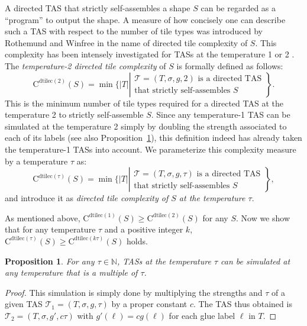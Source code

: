 \documentclass{article}
\newtheorem{proposition}[theorem]{Proposition}
\theoremstyle{remark}
\theoremstyle{definition}
\newcommand{\tas}{\ensuremath{\mathcal{T}}}
\newcommand{\dtilec}[1]{\ensuremath{\mathrm{C}^{\mathrm{dtilec}(#1)}}}
\begin{document}
A directed TAS that strictly self-assembles a shape $S$ can be regarded as a ``program'' to output the shape. 
A measure of how concisely one can describe such a TAS with respect to the number of tile types was introduced by Rothemund and Winfree \cite{RothemundWinfree2000} in the name of directed tile complexity of $S$. 
This complexity has been intensely investigated for TASs at the temperature 1 or 2 \cite{AdChGoHuKeEsRo2002}. 
The {\it temperature-2 directed tile complexity} of $S$ is formally defined as follows: 
\[
	\dtilec{2}(S) = \min \biggl\{|T| 
	\left| 
	\begin{array}{r}
	\mbox{$\tas = (T, \sigma, g, 2)$ is a directed TAS} \\ 
	\mbox{that strictly self-assembles $S$} 
	\end{array}
	\right\}. 
\]
This is the minimum number of tile types required for a directed TAS at the temperature 2 to strictly self-assemble $S$. 
Since any temperature-1 TAS can be simulated at the temperature 2 simply by doubling the strength associated to each of its labels (see also Proposition~\ref{prop:simulation_at_high_temp}), this definition indeed has already taken the temperature-1 TASs into account. 
We parameterize this complexity measure by a temperature $\tau$ as: 
\[
	\dtilec{\tau}(S) = \min \biggl\{|T| 
	\left| 
	\begin{array}{r}
	\mbox{$\tas = (T, \sigma, g, \tau)$ is a directed TAS} \\ 
	\mbox{that strictly self-assembles $S$} 
	\end{array}
	\right\},  
\]
and introduce it as {\it directed tile complexity of $S$ at the temperature $\tau$}. 

As mentioned above, $\dtilec{1}(S) \ge \dtilec{2}(S)$ for any $S$. 
Now we show that for any temperature $\tau$ and a positive integer $k$, $\dtilec{\tau}(S) \ge \dtilec{k\tau}(S)$ holds. 

\begin{proposition}\label{prop:simulation_at_high_temp}
	For any $\tau \in \mathbb{N}$, TASs at the temperature $\tau$ can be simulated at any temperature that is a multiple of $\tau$. 
\end{proposition}
\begin{proof}
	This simulation is simply done by multiplying the strengths and $\tau$ of a given TAS $\tas_1 = (T, \sigma, g, \tau)$ by a proper constant $c$. 
	The TAS thus obtained is $\tas_2 = (T, \sigma, g', c\tau)$ with $g'(\ell) = c g(\ell)$ for each glue label $\ell$ in $T$. 
\end{proof}
\end{document}
